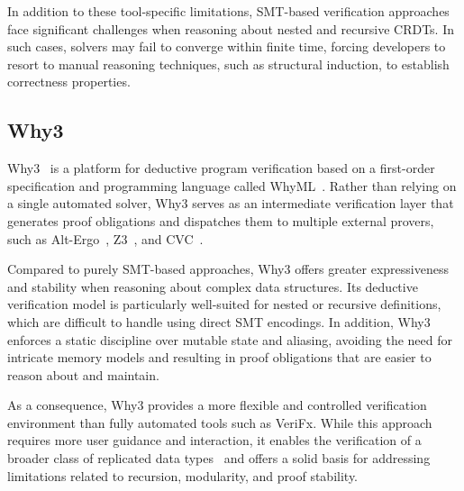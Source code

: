 In addition to these tool-specific limitations, SMT-based verification approaches face significant challenges when reasoning about nested and recursive CRDTs. In such cases, solvers may fail to converge within finite time, forcing developers to resort to manual reasoning techniques, such as structural induction, to establish correctness properties.

\subsection{Why3}
\label{sub:why3}

Why3~\cite{why3} is a platform for deductive program verification based on a first-order specification and programming language called WhyML~\cite{whyml}. Rather than relying on a single automated solver, Why3 serves as an intermediate verification layer that generates proof obligations and dispatches them to multiple external provers, such as Alt-Ergo~\cite{alt-ergo}, Z3~\cite{z3}, and CVC~\cite{cvc}.

Compared to purely SMT-based approaches, Why3 offers greater expressiveness and stability when reasoning about complex data structures. Its deductive verification model is particularly well-suited for nested or recursive definitions, which are difficult to handle using direct SMT encodings. In addition, Why3 enforces a static discipline over mutable state and aliasing, avoiding the need for intricate memory models and resulting in proof obligations that are easier to reason about and maintain.

As a consequence, Why3 provides a more flexible and controlled verification environment than fully automated tools such as VeriFx. While this approach requires more user guidance and interaction, it enables the verification of a broader class of replicated data types~\cite{meirim2019static} and offers a solid basis for addressing limitations related to recursion, modularity, and proof stability.

\endinput
